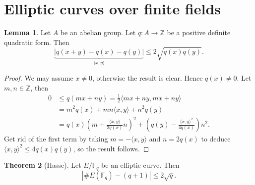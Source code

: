 \documentclass{article}
\theoremstyle{definition}
\newtheorem{theorem}{Theorem}[section]
\newtheorem{lemma}[theorem]{Lemma}
\begin{document}
\section{Elliptic curves over finite fields}
\begin{lemma}\label{lemma7.1}
    Let $A$ be an abelian group. Let $q : A \to \mathbb{Z}$ be a positive definite quadratic form. Then \[
    \underbrace{\left|q(x+y)-q(x)-q(y)\right|}_{\langle x,y \rangle}\le 2\sqrt{q(x)q(y)}.
    \] 
\end{lemma}
\begin{proof}
    We may assume $x \neq 0$, otherwise the result is clear. Hence $q(x) \neq 0$. Let $m,n \in \mathbb{Z}$, then 
    \begin{align*}
        0&\le q(mx+ny) = \frac{1}{2}\langle mx+ny,mx+ny \rangle \\
        &= m^2q(x) + mn \langle x,y \rangle +n^2q(y) \\
        &= q(x) \left( m + \frac{\langle x,y \rangle}{2q(x)}n\right)^2 + \left(q(y)- \frac{\langle x,y \rangle^2}{4q(x)}\right)n^2.
    \end{align*}
    Get rid of the first term by taking $m = - \langle x, y \rangle$ and $n = 2q(x)$ to deduce $\langle x,y \rangle^2 \le 4q(x)q(y)$, so the result follows.
\end{proof}
\begin{theorem}[Hasse]
    Let $E/\mathbb{F}_q$ be an elliptic curve. Then \[
    \left|\# E(\mathbb{F}_q) - (q+1)\right| \le 2\sqrt{q}.
    \]    
\end{theorem}
\end{document}
